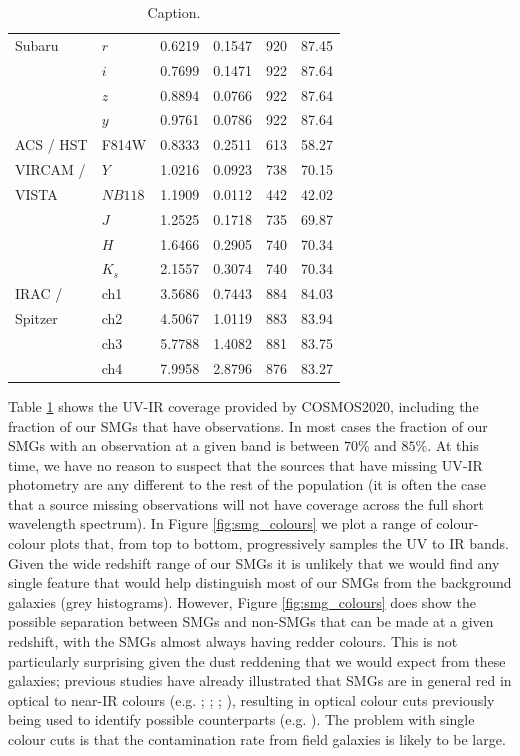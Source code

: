 \begin{table}
\begin{tabular}{p{4cm}|p{1.5cm}|p{2cm}|p{2cm}|p{1.5cm}|p{1.5cm}}
		Subaru & $r$ & 0.6219 & 0.1547 & 920 & 87.45 \\
		& $i$ & 0.7699 & 0.1471 & 922 & 87.64 \\
		& $z$ & 0.8894 & 0.0766 & 922 & 87.64 \\
		& $y$ & 0.9761 & 0.0786 & 922 & 87.64 \\
		\hline
		ACS / HST & F814W & 0.8333 & 0.2511 & 613 & 58.27 \\
		\hline
		VIRCAM / & $Y$ & 1.0216 & 0.0923 & 738 & 70.15 \\
		VISTA & $NB118$ & 1.1909 & 0.0112 & 442 & 42.02 \\
		& $J$ & 1.2525 & 0.1718 & 735 & 69.87 \\
		& $H$ & 1.6466 & 0.2905 & 740 & 70.34 \\
		& $K_s$ & 2.1557 & 0.3074 & 740 & 70.34 \\
		\hline
		IRAC / & ch1 & 3.5686 & 0.7443 & 884 & 84.03 \\
		Spitzer & ch2 & 4.5067 & 1.0119 & 883 & 83.94 \\
		& ch3 & 5.7788 & 1.4082 & 881 & 83.75 \\
		& ch4 & 7.9958 & 2.8796 & 876 & 83.27 \\
		\hline
		\hline
    \end{tabular}
    \caption{{\color{red}Caption.}}
    \label{tab:smg_coverage}
\end{table}

Table \ref{tab:smg_coverage} shows the UV-IR coverage provided by COSMOS2020, including the fraction of our SMGs that have observations. In most cases the fraction of our SMGs with an observation at a given band is between $70\%$ and $85\%$. At this time, we have no reason to suspect that the sources that have missing UV-IR photometry are any different to the rest of the population (it is often the case that a source missing observations will not have coverage across the full short wavelength spectrum). In Figure \ref{fig:smg_colours} we plot a range of colour-colour plots that, from top to bottom, progressively samples the UV to IR bands. Given the wide redshift range of our SMGs it is unlikely that we would find any single feature that would help distinguish most of our SMGs from the background galaxies (grey histograms). However, Figure \ref{fig:smg_colours} does show the possible separation between SMGs and non-SMGs that can be made at a given redshift, with the SMGs almost always having redder colours. This is not particularly surprising given the dust reddening that we would expect from these galaxies; previous studies have already illustrated that SMGs are in general red in optical to near-IR colours (e.g. \citealt{Smail_2002}; \citealt{Dannerbauer_2004}; \citealt{Wang_2012}; \citealt{Chen_2016}), resulting in optical colour cuts previously being used to identify possible counterparts (e.g. \citealt{Michalowski_2012b}). The problem with single colour cuts is that the contamination rate from field galaxies is likely to be large.

